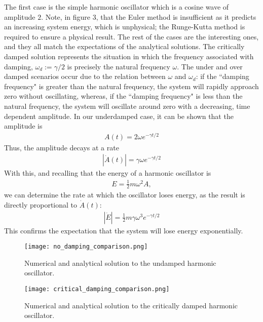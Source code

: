 \documentclass[letter,12pt]{article}
\begin{document}
The first case is the simple harmonic oscillator which is a cosine wave of amplitude $2$. Note, in figure $3$, that the Euler method is insufficient as it predicts an increasing system energy, which is unphysical; the Runge-Kutta method is required to ensure a physical result. The rest of the cases are the interesting ones, and they all match the expectations of the analytical solutions. The critically damped solution represents the situation in which the frequency associated with damping, $\omega_d := \gamma/2$ is precisely the natural frequency $\omega$. The under and over damped scenarios occur due to the relation between $\omega$ and $\omega_d$: if the ``damping frequency" is greater than the natural frequency, the system will rapidly approach zero without oscillating, whereas, if the ``damping frequency" is less than the natural frequency, the system will oscillate around zero with a decreasing, time dependent amplitude. In our underdamped case, it can be shown that the amplitude is 
\begin{align}
A(t) = 2\omega e^{-\gamma t /2}
\end{align}
Thus, the amplitude decays at a rate 
\begin{align}
|\dot{A}(t)| = \gamma \omega e^{-\gamma t /2}
\end{align}
With this, and recalling that the energy of a harmonic oscillator is 
\begin{align}
E = \frac{1}{2} m \omega^2 A,
\end{align}
we can determine the rate at which the oscillator loses energy, as the result is directly proportional to $\dot{A}(t)$:
\begin{align}
|\dot{E}| = \frac{1}{2} m \gamma \omega^3 e^{-\gamma t / 2} 
\end{align}
This confirms the expectation that the system will lose energy exponentially. 


\begin{figure}[htbp]
    \centering
    \texttt{[image: no\_damping\_comparison.png]}
    \caption{Numerical and analytical solution to the undamped harmonic oscillator.}
\end{figure}

\begin{figure}[htbp]
    \centering
    \texttt{[image: critical\_damping\_comparison.png]}
    \caption{Numerical and analytical solution to the critically damped harmonic oscillator.}
\end{figure}
\end{document}
